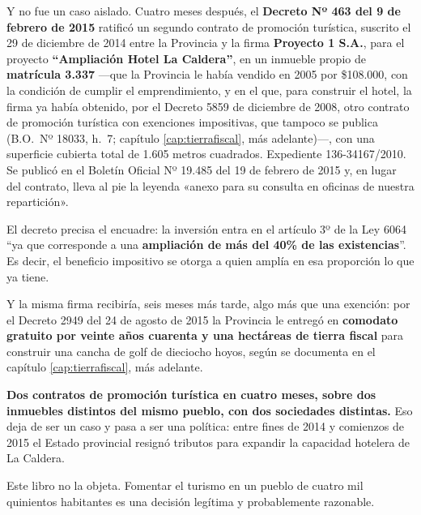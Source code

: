 \begin{cautela}
Y no fue un caso aislado. Cuatro meses después, el \textbf{Decreto Nº 463 del 9 de febrero de 2015} ratificó un segundo contrato de promoción turística, suscrito el 29 de diciembre de 2014 entre la Provincia y la firma \textbf{Proyecto 1 S.A.}, para el proyecto \textbf{``Ampliación Hotel La Caldera''}, en un inmueble propio de \textbf{matrícula 3.337} ---que la Provincia le había vendido en 2005 por \$108.000, con la condición de cumplir el emprendimiento, y en el que, para construir el hotel, la firma ya había obtenido, por el Decreto 5859 de diciembre de 2008, otro contrato de promoción turística con exenciones impositivas, que tampoco se publica (B.O.\ Nº 18033, h.\ 7; capítulo \ref{cap:tierrafiscal}, más adelante)---, con una superficie cubierta total de 1.605 metros cuadrados. Expediente 136-34167/2010. Se publicó en el Boletín Oficial Nº 19.485 del 19 de febrero de 2015 y, en lugar del contrato, lleva al pie la leyenda «anexo para su consulta en oficinas de nuestra repartición».

El decreto precisa el encuadre: la inversión entra en el artículo 3º de la Ley 6064 ``ya que corresponde a una \textbf{ampliación de más del 40\% de las existencias}''. Es decir, el beneficio impositivo se otorga a quien amplía en esa proporción lo que ya tiene.

Y la misma firma recibiría, seis meses más tarde, algo más que una exención: por el Decreto 2949 del 24 de agosto de 2015 la Provincia le entregó en \textbf{comodato gratuito por veinte años cuarenta y una hectáreas de tierra fiscal} para construir una cancha de golf de dieciocho hoyos, según se documenta en el capítulo \ref{cap:tierrafiscal}, más adelante.

\textbf{Dos contratos de promoción turística en cuatro meses, sobre dos inmuebles distintos del mismo pueblo, con dos sociedades distintas.} Eso deja de ser un caso y pasa a ser una política: entre fines de 2014 y comienzos de 2015 el Estado provincial resignó tributos para expandir la capacidad hotelera de La Caldera.

Este libro no la objeta. Fomentar el turismo en un pueblo de cuatro mil quinientos habitantes es una decisión legítima y probablemente razonable.


\end{cautela}
